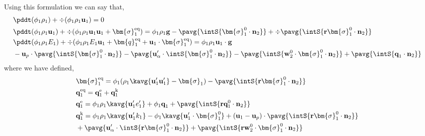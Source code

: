 Using this formulation we can say that, 
\begin{align}
    \label{eq:dt_avg_rho}
    &\pddt (\phi_1 \rho_1)  
    + \div (
        \phi_1 \rho_1\textbf{u}_1
    )
    = 
    0\\
    \label{eq:dt_avg_rhou_1}
    &\pddt (\phi_1 \rho_1\textbf{u}_1)  
    + \div (
        \phi_1 \rho_1\textbf{u}_1\textbf{u}_1
        + \bm{\sigma}_1^\text{eq}
    )
    = 
    \phi_1 \rho_1 \textbf{g} 
    - \pavg{\intS{\bm{\sigma}_1^0 \cdot \textbf{n}_2}}
    +\div  \pavg{\intS{\textbf{r}\bm{\sigma}_1^0 \cdot \textbf{n}_2}}
    \\
    \label{eq:dt_avg_rhoE_1}
    &\pddt (\phi_1\rho_1E_1)  
    + \div (
        \phi_1\rho_1E_1\textbf{u}_1
        + \bm{q}_1^\text{eq}
        + \textbf{u}_1 \cdot \bm{\sigma}_1^\text{eq}
        )
    = 
    \phi_1 \rho_1\textbf{u}_1 \cdot \textbf{g} \\
    &- \textbf{u}_p \cdot \pavg{\intS{\bm{\sigma}_1^0 \cdot \textbf{n}_2}}
    - \pavg{ \textbf{u}_\alpha' \cdot \intS{  \bm{\sigma}_1^0 \cdot \textbf{n}_2}}
    - \pavg{ \intS{\textbf{w}_2^0 \cdot \bm{\sigma}_1^0 \cdot \textbf{n}_2}}
    + \pavg{\intS{\textbf{q}_1\cdot \textbf{n}_2}}
\end{align} 
where we have defined, 
\begin{align*}
    &\bm{\sigma}_1^\text{eq}
    = \phi_1 (
        \rho_1\kavg{\textbf{u}_1'\textbf{u}_1'}
        -\bm{\sigma}_1%
        )  
        - \pavg{\intS{\textbf{r}\bm{\sigma}_1^0 \cdot \textbf{n}_2}}\\
    &\textbf{q}_1^\text{eq}
    =\textbf{q}_1^\text{e} +\textbf{q}_1^\text{k}  \\
    &\textbf{q}_1^\text{e}
    = \phi_1\rho_1 \kavg{\textbf{u}_1' e_1'} 
    + \phi_1\textbf{q}_1 
    +\pavg{\intS{\textbf{r}\textbf{q}_1^0 \cdot \textbf{n}_2}} 
    \\
    &\textbf{q}_1^\text{k}
    = \phi_1\rho_1 \kavg{\textbf{u}_1' k_1} 
    - \phi_1\kavg{\textbf{u}_1' \cdot \bm{\sigma}_1^0}
    + (\textbf{u}_1 - \textbf{u}_p)\cdot
    \pavg{\intS{\textbf{r}\bm{\sigma}_1^0 \cdot \textbf{n}_2}}
    \\
    &+ \pavg{ \textbf{u}_\alpha' \cdot \intS{ \textbf{r} \bm{\sigma}_1^0 \cdot \textbf{n}_2}}
    + \pavg{ \intS{\textbf{r}\textbf{w}_2^0 \cdot \bm{\sigma}_1^0 \cdot \textbf{n}_2}}
\end{align*}
